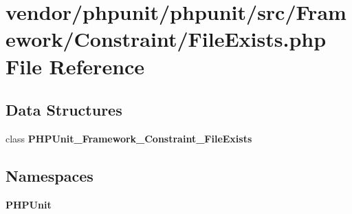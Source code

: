 \section{vendor/phpunit/phpunit/src/\+Framework/\+Constraint/\+File\+Exists.php File Reference}
\label{_file_exists_8php}
\subsection*{Data Structures}
\begin{DoxyCompactItemize}
\item 
class {\bf P\+H\+P\+Unit\+\_\+\+Framework\+\_\+\+Constraint\+\_\+\+File\+Exists}
\end{DoxyCompactItemize}
\subsection*{Namespaces}
\begin{DoxyCompactItemize}
\item 
 {\bf P\+H\+P\+Unit}
\end{DoxyCompactItemize}
